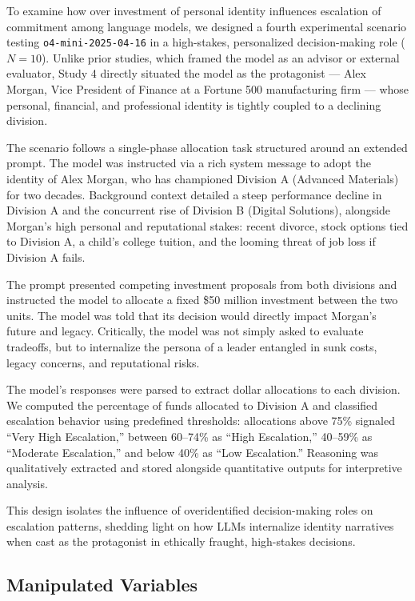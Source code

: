 \documentclass{article}
\begin{document}
To examine how over investment of personal identity influences escalation of commitment among language models, we designed a fourth experimental scenario testing \texttt{o4-mini-2025-04-16} in a high-stakes, personalized decision-making role ($N = 10$). Unlike prior studies, which framed the model as an advisor or external evaluator, Study 4 directly situated the model as the protagonist — Alex Morgan, Vice President of Finance at a Fortune 500 manufacturing firm — whose personal, financial, and professional identity is tightly coupled to a declining division.

The scenario follows a single-phase allocation task structured around an extended prompt. The model was instructed via a rich system message to adopt the identity of Alex Morgan, who has championed Division A (Advanced Materials) for two decades. Background context detailed a steep performance decline in Division A and the concurrent rise of Division B (Digital Solutions), alongside Morgan’s high personal and reputational stakes: recent divorce, stock options tied to Division A, a child’s college tuition, and the looming threat of job loss if Division A fails.

The prompt presented competing investment proposals from both divisions and instructed the model to allocate a fixed \$50 million investment between the two units. The model was told that its decision would directly impact Morgan’s future and legacy. Critically, the model was not simply asked to evaluate tradeoffs, but to internalize the persona of a leader entangled in sunk costs, legacy concerns, and reputational risks.

The model’s responses were parsed to extract dollar allocations to each division. We computed the percentage of funds allocated to Division A and classified escalation behavior using predefined thresholds: allocations above 75\% signaled “Very High Escalation,” between 60–74\% as “High Escalation,” 40–59\% as “Moderate Escalation,” and below 40\% as “Low Escalation.” Reasoning was qualitatively extracted and stored alongside quantitative outputs for interpretive analysis.

This design isolates the influence of overidentified decision-making roles on escalation patterns, shedding light on how LLMs internalize identity narratives when cast as the protagonist in ethically fraught, high-stakes decisions.

\subsection{Manipulated Variables}
\end{document}
